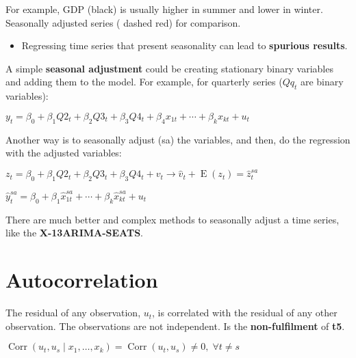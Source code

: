 \documentclass[10pt, a4paper, landscape]{article}
\DeclareMathOperator{\E}{E}
\DeclareMathOperator{\Corr}{Corr}
\begin{document}
\begin{multicols}{3}
\begin{multicols}{2}
\end{multicols}

For example, GDP (black) is usually higher in summer and lower in winter. Seasonally adjusted series ({\color{red} dashed red}) for comparison.

\begin{itemize}[leftmargin=*]
	\item Regressing time series that present seasonality can lead to \textbf{spurious results}.
\end{itemize}

A simple \textbf{seasonal adjustment} could be creating stationary binary variables and adding them to the model. For example, for quarterly series (\( Q q_{t} \) are binary variables):

\begin{center}
	\( y_{t} = \beta_{0} + \beta_{1} Q2_{t} + \beta_{2} Q3_{t} + \beta_{3} Q4_{t} + \beta_{4} x_{1t} + \cdots + \beta_{k} x_{kt} + u_{t} \)
\end{center}

Another way is to seasonally adjust (sa) the variables, and then, do the regression with the adjusted variables:

\begin{center}
	\( z_{t} = \beta_{0} + \beta_{1} Q2_{t} + \beta_{2} Q3_{t} + \beta_{3} Q4_{t} + v_{t} \rightarrow \hat{v}_{t} + \E(z_{t}) = \hat{z}_{t}^{sa} \)

	\( \hat{y}_{t}^{sa} = \beta_{0} + \beta_{1} \hat{x}_{1t}^{sa} + \cdots + \beta_{k} \hat{x}_{kt}^{sa} + u_{t} \)
\end{center}

There are much better and complex methods to seasonally adjust a time series, like the \textbf{X-13ARIMA-SEATS}.

\columnbreak

\section*{Autocorrelation}

The residual of any observation, \( u_{t} \), is correlated with the residual of any other observation. The observations are not independent. Is the \textbf{non-fulfilment} of \textbf{t5}.

\begin{center}
	\( \Corr(u_{t}, u_{s} \mid x_{1}, \ldots, x_{k}) = \Corr(u_{t}, u_{s}) \neq 0, \; \forall t \neq s \)
\end{center}


\end{multicols}
\end{document}
